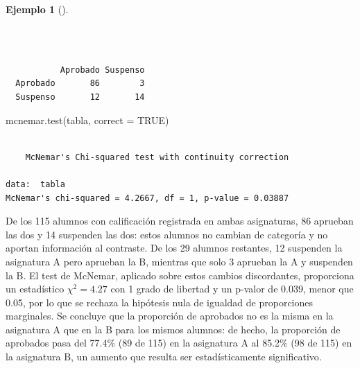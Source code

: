 \documentclass[
  spanish,
  a4paper,
]{scrreport}
\newenvironment{Shaded}{\begin{snugshade}}{\end{snugshade}}
\newcommand{\AttributeTok}[1]{\textcolor[rgb]{0.40,0.45,0.13}{#1}}
\newcommand{\ConstantTok}[1]{\textcolor[rgb]{0.56,0.35,0.01}{#1}}
\newcommand{\FunctionTok}[1]{\textcolor[rgb]{0.28,0.35,0.67}{#1}}
\newcommand{\NormalTok}[1]{\textcolor[rgb]{0.00,0.23,0.31}{#1}}
\newcommand{\OtherTok}[1]{\textcolor[rgb]{0.00,0.23,0.31}{#1}}
\newcommand{\SpecialCharTok}[1]{\textcolor[rgb]{0.37,0.37,0.37}{#1}}
\theoremstyle{definition}
\newtheorem{example}{Ejemplo}[chapter]
\theoremstyle{definition}
\theoremstyle{remark}
\begin{document}
\begin{example}[]\protect\hypertarget{exm-dospareadas-mcnemar}{}\label{exm-dospareadas-mcnemar}

~

\begin{Shaded}
\end{Shaded}

\begin{verbatim}
          
           Aprobado Suspenso
  Aprobado       86        3
  Suspenso       12       14
\end{verbatim}

\begin{Shaded}
\begin{Highlighting}[]
\FunctionTok{mcnemar.test}\NormalTok{(tabla, }\AttributeTok{correct =} \ConstantTok{TRUE}\NormalTok{)}
\end{Highlighting}
\end{Shaded}

\begin{verbatim}

    McNemar's Chi-squared test with continuity correction

data:  tabla
McNemar's chi-squared = 4.2667, df = 1, p-value = 0.03887
\end{verbatim}

De los 115 alumnos con calificación registrada en ambas asignaturas, 86
aprueban las dos y 14 suspenden las dos: estos alumnos no cambian de
categoría y no aportan información al contraste. De los 29 alumnos
restantes, 12 suspenden la asignatura A pero aprueban la B, mientras que
solo 3 aprueban la A y suspenden la B. El test de McNemar, aplicado
sobre estos cambios discordantes, proporciona un estadístico
\(\chi^2=4.27\) con 1 grado de libertad y un p-valor de 0.039, menor que
0.05, por lo que se rechaza la hipótesis nula de igualdad de
proporciones marginales. Se concluye que la proporción de aprobados no
es la misma en la asignatura A que en la B para los mismos alumnos: de
hecho, la proporción de aprobados pasa del 77.4\% (89 de 115) en la
asignatura A al 85.2\% (98 de 115) en la asignatura B, un aumento que
resulta ser estadísticamente significativo.

\end{example}
\end{document}
